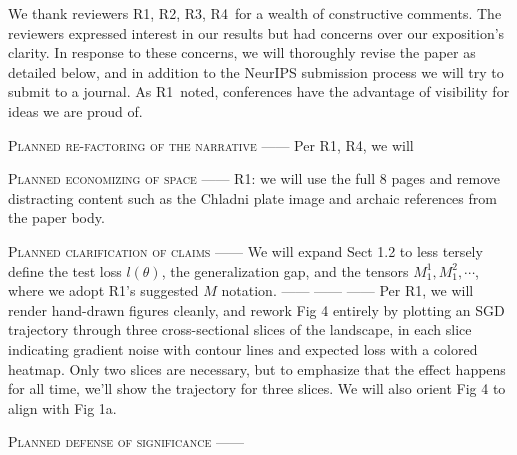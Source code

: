 \documentclass{article}
\newcommand{\Ra}{\textmd{\textsf{\color{brown} {R1}}}}
\newcommand{\Rb}{\textmd{\textsf{\color{green} {R2}}}}
\newcommand{\Rc}{\textmd{\textsf{\color{blue} {R3}}}}
\newcommand{\Rd}{\textmd{\textsf{\color{purple} {R4}}}}
\newcommand{\sct}[1]{\textmd{\textsf{Sect #1}}}
\newcommand{\fig}[1]{\textmd{\textsf{Fig #1}}}
\begin{document}
    We thank reviewers \Ra, \Rb, \Rc, \Rd\ for a wealth of constructive
    comments.  The reviewers expressed interest in our results but had concerns
    over our exposition's clarity. In response to these concerns, we will
    thoroughly revise the paper as detailed below, and in addition to the
    NeurIPS submission process we will try to submit to a journal.  As \Ra\
    noted, conferences have the advantage of visibility for ideas we are proud
    of.

%

    \textsc{Planned re-factoring of the narrative}
    ------
    Per \Ra, \Rd, we will

%

    \textsc{Planned economizing of space}
    ------
    \Ra: we will use the full 8 pages and remove distracting content such as
    the Chladni plate image and archaic references from the paper body.  

%

    \textsc{Planned clarification of claims}
    ------
    We will expand \sct{1.2} to less tersely define the test loss $l(\theta)$,
    the generalization gap, and the tensors $M^1_1, M^2_1, \cdots$, where
    we adopt \Ra's suggested $M$ notation.
    ------
    ------
    ------
    Per \Ra, we will render hand-drawn figures cleanly, and rework \fig{4}
    entirely by plotting an SGD trajectory through three cross-sectional slices
    of the landscape, in each slice indicating gradient noise with contour
    lines and expected loss with a colored heatmap.  Only two slices are
    necessary, but to emphasize that the effect happens for all time, we'll
    show the trajectory for three slices.  We will also orient \fig{4} to align
    with \fig{1a}.

%

    \textsc{Planned defense of significance}
    ------

%
\end{document}
